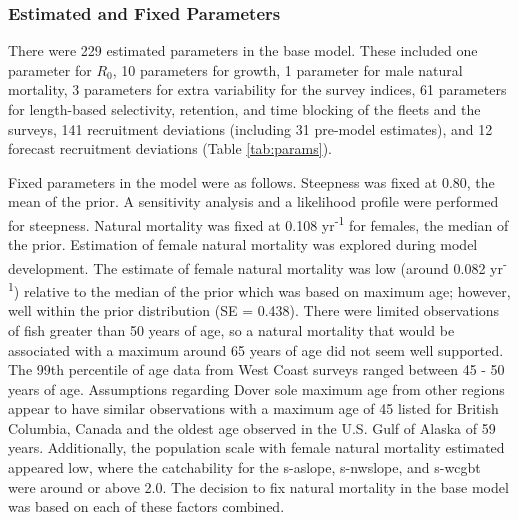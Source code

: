 \documentclass[11pt,
  english,
  a4paper,
]{article}
\begin{document}
\leavevmode\tagmcend\tagstructend\par


\hypertarget{estimated-and-fixed-parameters}{%
\subsubsection{Estimated and Fixed Parameters}\label{estimated-and-fixed-parameters}}

\leavevmode\tagmcend\tagstructend


There were 229 estimated parameters in the base model. These included one parameter for {\(R_0\)\leavevmode\tagmcend\tagstructend}, 10 parameters for growth, 1 parameter for male natural mortality, 3 parameters for extra variability for the survey indices, 61 parameters for length-based selectivity, retention, and time blocking of the fleets and the surveys, 141 recruitment deviations (including 31 pre-model estimates), and 12 forecast recruitment deviations (Table \ref{tab:params}).

\leavevmode\tagmcend\tagstructend\par


Fixed parameters in the model were as follows. Steepness was fixed at 0.80, the mean of the prior. A sensitivity analysis and a likelihood profile were performed for steepness. Natural mortality was fixed at 0.108 yr\textsuperscript{-1} for females, the median of the prior. Estimation of female natural mortality was explored during model development. The estimate of female natural mortality was low (around 0.082 yr\textsuperscript{-1}) relative to the median of the prior which was based on maximum age; however, well within the prior distribution (SE = 0.438). There were limited observations of fish greater than 50 years of age, so a natural mortality that would be associated with a maximum around 65 years of age did not seem well supported. The 99th percentile of age data from West Coast surveys ranged between 45 - 50 years of age. Assumptions regarding Dover sole maximum age from other regions appear to have similar observations with a maximum age of 45 listed for British Columbia, Canada and the oldest age observed in the U.S. Gulf of Alaska of 59 years. Additionally, the population scale with female natural mortality estimated appeared low, where the catchability for the \gls{s-aslope}, \gls{s-nwslope}, and \gls{s-wcgbt} were around or above 2.0. The decision to fix natural mortality in the base model was based on each of these factors combined.
\end{document}

